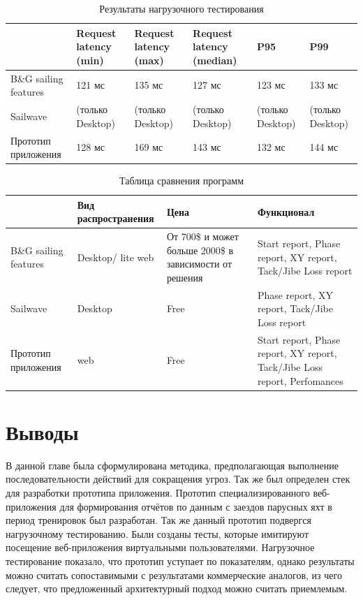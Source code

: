 \begin{table}
	\caption{Результаты нагрузочного тестирования}
	\label{loadTestResult}
	\begin{tabularx}{\linewidth}{|X|X|X|X|X|X|}
		\hline
		& Request latency (min) & Request latency (max) & Request latency (median) & P95 & P99\\
		\hline
		B\&G sailing features & 121 мс & 135 мс & 127 мс & 123 мс & 133 мс \\
		\hline
		Sailwave & (только Desktop) & (только Desktop) & (только Desktop) & (только Desktop) & (только Desktop)\\
		\hline
		Прототип приложения & 128 мс & 169 мс & 143 мс & 132 мс & 144 мс\\
		\hline
	\end{tabularx}
\end{table}

\begin{table}
	\caption{Таблица сравнения программ}
	\label{TableOfCmpPrograms}
	\begin{tabularx}{\linewidth}{|X|X|X|X|}
		\hline
		& Вид распространения & Цена & Функционал\\
		\hline
		B\&G sailing features & Desktop/ lite web & От 700\$ и может больше 2000\$ в зависимости от решения & Start report,
		Phase report,
		XY report,
		Tack/Jibe Loss report\\
		\hline
		Sailwave & Desktop & Free &Phase report,
		XY report,
		Tack/Jibe Loss report\\
		\hline
		Прототип приложения & web & Free & Start report,
		Phase report,
		XY report,
		Tack/Jibe Loss report,
		Perfomances\\
		\hline
	\end{tabularx}
\end{table}

\newpage

\section{Выводы} \label{ch3:conclusion}

В данной главе была сформулирована методика, предполагающая выполнение последовательности действий для сокращения угроз. Так же был определен стек для разработки прототипа приложения. Прототип специализированного веб-приложения для формирования отчётов по данным с заездов парусных яхт в период тренировок был разработан. Так же данный прототип подвергся нагрузочному тестированию. Были созданы тесты, которые имитируют посещение веб-приложения виртуальными пользователями. Нагрузочное тестирование показало, что прототип уступает по показателям, однако результаты можно считать сопоставимыми с результатами коммерческие аналогов, из чего следует, что предложенный архитектурный подход можно считать приемлемым.


%
